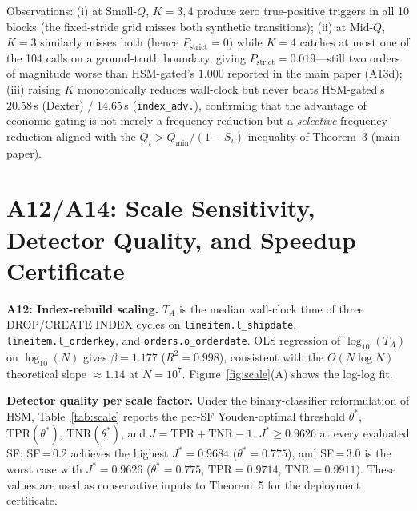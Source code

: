 \documentclass[10pt,twocolumn,a4paper]{article}
\newcommand{\TPR}{\mathrm{TPR}}
\newcommand{\TNR}{\mathrm{TNR}}
\begin{document}
Observations: (i) at Small-$Q$, $K\!=\!3,4$ produce zero true-positive
triggers in all 10 blocks (the fixed-stride grid misses both synthetic
transitions); (ii) at Mid-$Q$, $K\!=\!3$ similarly misses both (hence
$P_{\mathrm{strict}}\!=\!0$) while $K\!=\!4$ catches at most one of
the 104 calls on a ground-truth boundary, giving
$P_{\mathrm{strict}}\!=\!0.019$---still two orders of magnitude worse
than HSM-gated's $1.000$ reported in the main paper (A13d);
(iii) raising $K$ monotonically reduces wall-clock but never beats
HSM-gated's $20.58$\,s (Dexter) / $14.65$\,s (\texttt{index\_adv.}),
confirming that the advantage of economic gating is not merely a
frequency reduction but a \emph{selective} frequency reduction aligned
with the $Q_i\!>\!Q_{\min}/(1\!-\!S_i)$
inequality of Theorem~3 (main paper).

\section{A12/A14: Scale Sensitivity, Detector Quality, and Speedup Certificate}\label{supp:a12a14}

\textbf{A12: Index-rebuild scaling.}
$T_A$ is the median wall-clock time of three DROP/CREATE INDEX cycles on
\texttt{lineitem.l\_shipdate}, \texttt{lineitem.l\_orderkey}, and
\texttt{orders.o\_orderdate}.
OLS regression of $\log_{10}(T_A)$ on $\log_{10}(N)$ gives
$\beta\!=\!1.177$ ($R^2\!=\!0.998$), consistent with the
$\Theta(N\log N)$ theoretical slope $\approx\!1.14$ at $N\!=\!10^{7}$.
Figure~\ref{fig:scale}(A) shows the log-log fit.

\textbf{Detector quality per scale factor.}
Under the binary-classifier reformulation of HSM,
Table~\ref{tab:scale} reports the per-SF Youden-optimal threshold
$\theta^{*}$, $\TPR(\theta^{*})$, $\TNR(\theta^{*})$, and
$J\!=\!\TPR\!+\!\TNR\!-\!1$.
$J^{*}\!\ge\!0.9626$ at every evaluated SF; SF\,=\,0.2 achieves the
highest $J^{*}\!=\!0.9684$ ($\theta^{*}\!=\!0.775$), and SF\,=\,3.0
is the worst case with $J^{*}\!=\!0.9626$ ($\theta^{*}\!=\!0.775$,
$\TPR\!=\!0.9714$, $\TNR\!=\!0.9911$). These values are used as
conservative inputs to Theorem~5 for the deployment certificate.
\end{document}
